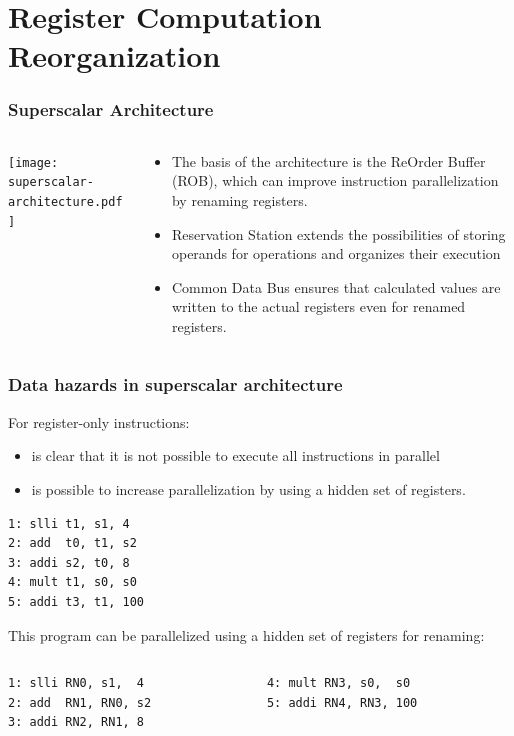 \documentclass{beamer}
\begin{document}
\section{Register Computation Reorganization}

\begin{frame}
\frametitle{Superscalar Architecture}
\begin{columns}
\begin{column}{0.55\textwidth}
\texttt{[image: superscalar-architecture.pdf]}
\end{column}
\begin{column}{0.45\textwidth}
\begin{itemize}
\item The basis of the architecture is the ReOrder Buffer (ROB), which can improve instruction parallelization by renaming registers.
\item Reservation Station extends the possibilities of storing operands for operations and organizes their execution
\item Common Data Bus ensures that calculated values are written to the actual registers even for renamed registers.
\end{itemize}
\end{column}
\end{columns}
\end{frame}


\begin{frame}[fragile]
\frametitle{Data hazards in superscalar architecture}

For register-only instructions:
\begin{itemize}
\item is clear that it is not possible to execute all instructions in parallel
\item is possible to increase parallelization by using a hidden set of registers.
\end{itemize}

\begin{verbatim}
1: slli t1, s1, 4
2: add  t0, t1, s2
3: addi s2, t0, 8
4: mult t1, s0, s0
5: addi t3, t1, 100
\end{verbatim}

This program can be parallelized using a hidden set of registers for renaming:

\begin{columns}[T]
\begin{column}{0.40\textwidth}
\begin{verbatim}
1: slli RN0, s1,  4
2: add  RN1, RN0, s2
3: addi RN2, RN1, 8
\end{verbatim}
\end{column}
\begin{column}{0.40\textwidth}
\begin{verbatim}
4: mult RN3, s0,  s0
5: addi RN4, RN3, 100
\end{verbatim}
\end{column}
\end{columns}
\end{frame}
\end{document}
